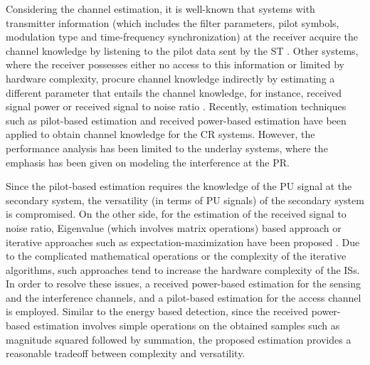Considering the channel estimation, it is well-known that systems with transmitter information (which includes the filter parameters, pilot symbols, modulation type and time-frequency synchronization) at the receiver acquire the channel knowledge by listening to the pilot data sent by the ST \cite{Gans71, Gifford05, Gifford08, Anna05}. Other systems, where the receiver possesses either no access to this information or limited by hardware complexity, procure channel knowledge indirectly by estimating a different parameter that entails the channel knowledge, for instance, received signal power  or received signal to noise ratio \cite{Chav11, Sharma13}. Recently, estimation techniques such as pilot-based estimation \cite{Suraweera10, Kim12} and received power-based estimation  have been applied to obtain channel knowledge for the CR systems. However, the performance analysis has been limited to the underlay systems, where the emphasis has been given on modeling the interference at the PR. 

Since the pilot-based estimation requires the knowledge of the PU signal at the secondary system, the versatility (in terms of PU signals) of the secondary system is compromised. On the other side, for the estimation of the received signal to noise ratio, Eigenvalue (which involves matrix operations) based approach \cite{Sharma13} or iterative approaches such as expectation-maximization have been proposed \cite{Chav11}. Due to the complicated mathematical operations or the complexity of the iterative algorithms, such approaches tend to increase the hardware complexity of the ISs. In order to resolve these issues, a received power-based estimation for the sensing and the interference channels, and a pilot-based estimation for the access channel is employed. Similar to the energy based detection, since the received power-based estimation involves simple operations on the obtained samples such as magnitude squared followed by summation, the proposed estimation provides a reasonable tradeoff between complexity and versatility. %

